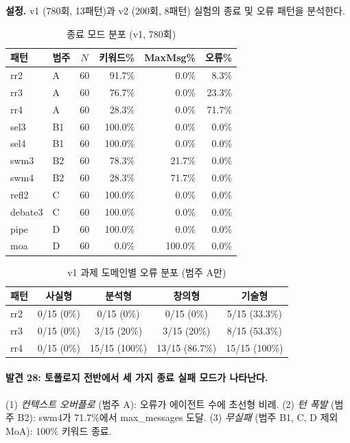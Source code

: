 \textbf{설정.} v1 (780회, 13패턴)과 v2 (200회, 8패턴) 실험의 종료 및 오류 패턴을 분석한다.

\begin{table}[H]
\centering
\caption{종료 모드 분포 (v1, 780회)}
\label{tab:termination-modes}
{\small
\begin{tabular}{llcrrr}
\toprule
패턴 & 범주 & $N$ & 키워드\% & MaxMsg\% & 오류\% \\
\midrule
rr2     & A  & 60 & 91.7\%  & 0.0\%   & 8.3\% \\
rr3     & A  & 60 & 76.7\%  & 0.0\%   & 23.3\% \\
rr4     & A  & 60 & 28.3\%  & 0.0\%   & 71.7\% \\
sel3    & B1 & 60 & 100.0\% & 0.0\%   & 0.0\% \\
sel4    & B1 & 60 & 100.0\% & 0.0\%   & 0.0\% \\
swm3    & B2 & 60 & 78.3\%  & 21.7\%  & 0.0\% \\
swm4    & B2 & 60 & 28.3\%  & 71.7\%  & 0.0\% \\
refl2   & C  & 60 & 100.0\% & 0.0\%   & 0.0\% \\
debate3 & C  & 60 & 100.0\% & 0.0\%   & 0.0\% \\
pipe    & D  & 60 & 100.0\% & 0.0\%   & 0.0\% \\
moa     & D  & 60 & 0.0\%   & 100.0\% & 0.0\% \\
\bottomrule
\end{tabular}
}
\end{table}

\begin{table}[H]
\centering
\caption{v1 과제 도메인별 오류 분포 (범주 A만)}
\label{tab:error-by-domain}
{\small
\begin{tabular}{lcccc}
\toprule
패턴 & 사실형 & 분석형 & 창의형 & 기술형 \\
\midrule
rr2 & 0/15 (0\%) & 0/15 (0\%) & 0/15 (0\%) & 5/15 (33.3\%) \\
rr3 & 0/15 (0\%) & 3/15 (20\%) & 3/15 (20\%) & 8/15 (53.3\%) \\
rr4 & 0/15 (0\%) & 15/15 (100\%) & 13/15 (86.7\%) & 15/15 (100\%) \\
\bottomrule
\end{tabular}
}
\end{table}

\paragraph{발견 28: 토폴로지 전반에서 세 가지 종료 실패 모드가 나타난다.}
(1) \emph{컨텍스트 오버플로} (범주 A): 오류가 에이전트 수에 초선형 비례. (2) \emph{턴 폭발} (범주 B2): swm4가 71.7\%에서 max\_messages 도달. (3) \emph{무실패} (범주 B1, C, D 제외 MoA): 100\% 키워드 종료.

